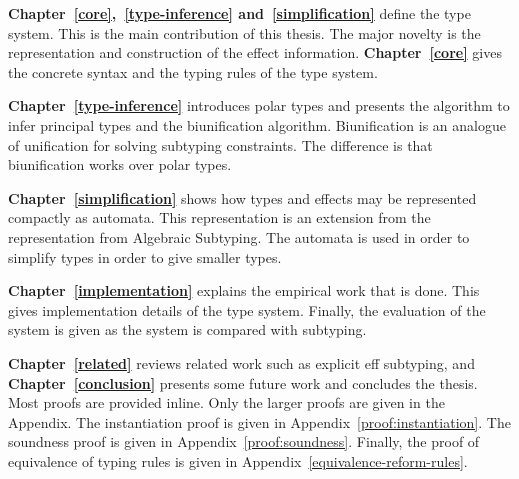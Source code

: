 \textbf{Chapter~\ref{core},~\ref{type-inference} and~\ref{simplification}} define the \core type system. This is the main contribution of this thesis. The major novelty is the representation and construction of the effect information. \textbf{Chapter~\ref{core}} gives the concrete syntax and the typing rules of the \core type system. 

\textbf{Chapter~\ref{type-inference}} introduces polar types and presents the algorithm to infer principal types and the biunification algorithm. Biunification is an analogue of unification for solving subtyping constraints. The difference is that biunification works over polar types. 

\textbf{Chapter~\ref{simplification}} shows how types and effects may be represented compactly as automata. This representation is an extension from the representation from Algebraic Subtyping. The automata is used in order to simplify types in order to give smaller types.

\textbf{Chapter~\ref{implementation}} explains the empirical work that is done. This gives implementation details of the \core type system. Finally, the evaluation of the \core system is given as the system is compared with subtyping.

\textbf{Chapter~\ref{related}} reviews related work such as explicit eff subtyping, and \textbf{Chapter~\ref{conclusion}} presents some future work and concludes the thesis. Most proofs are provided inline. Only the larger proofs are given in the Appendix. The instantiation proof is given in Appendix~\ref{proof:instantiation}. The soundness proof is given in Appendix~\ref{proof:soundness}. Finally, the proof of equivalence of typing rules is given in Appendix~\ref{equivalence-reform-rules}.
